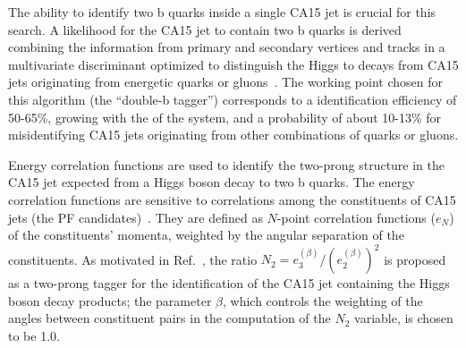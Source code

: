 The ability to identify two b quarks inside a single CA15 jet is crucial for this search. A likelihood for the CA15 jet to contain two b quarks is derived combining the information from primary and secondary vertices and tracks in a multivariate discriminant optimized to distinguish the Higgs to \bb decays from CA15 jets originating from energetic quarks or gluons~\cite{doubleb}.
The working point chosen for this algorithm (the ``double-b tagger'') corresponds to a \bb identification efficiency of 50-65\%, growing with the \pt of the \bb system, and a probability of about 10-13\% for misidentifying CA15 jets originating from other combinations of quarks or gluons.

Energy correlation functions are used to identify the two-prong
structure in the CA15 jet expected from a Higgs boson decay to two b
quarks. The energy correlation functions are sensitive to correlations among the constituents
of CA15 jets (the PF candidates)~\cite{ecf}. They are defined as $N$-point correlation functions ($e_N$) of the constituents' momenta, weighted by the angular separation of the constituents.
%                                                                                                                                                                                                
As motivated in Ref.~\cite{ecf}, the ratio $N_2 =
e_3^{(\beta)}/(e_2^{(\beta)})^2$ is proposed as a two-prong tagger for
the identification of the CA15 jet containing the Higgs boson decay
products; the parameter $\beta$, which controls the weighting of the angles between constituent pairs in the computation of
the $N_2$ variable, is chosen to be 1.0. 

